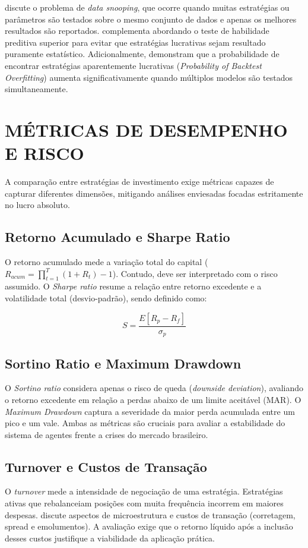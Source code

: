 \documentclass{eic-bcc-tcc}
\begin{document}
\citet{White2000} discute o problema de \textit{data snooping}, que ocorre quando muitas estratégias ou parâmetros são testados sobre o mesmo conjunto de dados e apenas os melhores resultados são reportados. \citet{Hansen2005} complementa abordando o teste de habilidade preditiva superior para evitar que estratégias lucrativas sejam resultado puramente estatístico. Adicionalmente, \citet{Bailey2014} demonstram que a probabilidade de encontrar estratégias aparentemente lucrativas (\textit{Probability of Backtest Overfitting}) aumenta significativamente quando múltiplos modelos são testados simultaneamente.

\section{MÉTRICAS DE DESEMPENHO E RISCO}

A comparação entre estratégias de investimento exige métricas capazes de capturar diferentes dimensões, mitigando análises enviesadas focadas estritamente no lucro absoluto.

\subsection{Retorno Acumulado e Sharpe Ratio}
O retorno acumulado mede a variação total do capital (\(R_{acum} = \prod_{t=1}^{T} (1 + R_t) - 1\)). Contudo, deve ser interpretado com o risco assumido. O \textit{Sharpe ratio} \citep{Sharpe1994, Lo2002} resume a relação entre retorno excedente e a volatilidade total (desvio-padrão), sendo definido como:

\begin{equation}
S = \frac{E[R_p - R_f]}{\sigma_p}
\end{equation}

\subsection{Sortino Ratio e Maximum Drawdown}
O \textit{Sortino ratio} \citep{Sortino1994} considera apenas o risco de queda (\textit{downside deviation}), avaliando o retorno excedente em relação a perdas abaixo de um limite aceitável (MAR). O \textit{Maximum Drawdown} \citep{Magdon2004} captura a severidade da maior perda acumulada entre um pico e um vale. Ambas as métricas são cruciais para avaliar a estabilidade do sistema de agentes frente a crises do mercado brasileiro.

\subsection{Turnover e Custos de Transação}
O \textit{turnover} mede a intensidade de negociação de uma estratégia. Estratégias ativas que rebalanceiam posições com muita frequência incorrem em maiores despesas. \citet{Harris2003} discute aspectos de microestrutura e custos de transação (corretagem, spread e emolumentos). A avaliação exige que o retorno líquido após a inclusão desses custos justifique a viabilidade da aplicação prática.
\end{document}
